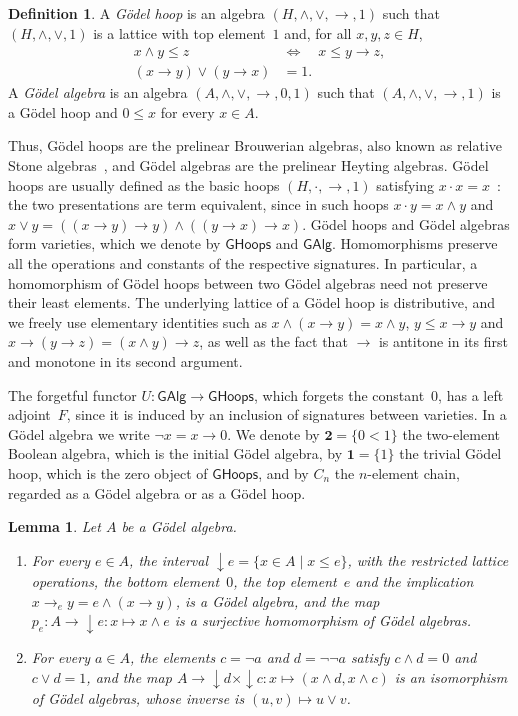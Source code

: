 \documentclass[reqno,a4paper]{amsart}
\theoremstyle{plain}
\newtheorem{lemma}[subsection]{Lemma}
\theoremstyle{definition}
\newtheorem{definition}[subsection]{Definition}
\theoremstyle{remark}
\numberwithin{equation}{section}
\newcommand{\two}{\mathbf{2}}
\newcommand{\GHoops}{\ensuremath{\mathsf{GHoops}}}
\newcommand{\GAlg}{\ensuremath{\mathsf{GAlg}}}
\newcommand{\one}{\mathbf{1}}
\newcommand{\down}{{\downarrow}}
\begin{document}
\begin{definition}\label{DefGodel}
A \emph{G\"odel hoop} is an algebra $(H,\wedge,\vee,\to,1)$ such that $(H,\wedge,\vee,1)$ is a lattice with top element~$1$ and, for all $x,y,z\in H$,
\begin{align}
x\wedge y\leq z\quad&\Longleftrightarrow\quad x\leq y\to z,\label{EqResiduation}\\
(x\to y)\vee(y\to x)&=1.\label{EqPrelinearity}
\end{align}
A \emph{G\"odel algebra} is an algebra $(A,\wedge,\vee,\to,0,1)$ such that $(A,\wedge,\vee,\to,1)$ is a G\"odel hoop and $0\leq x$ for every $x\in A$.
\end{definition}

Thus, G\"odel hoops are the prelinear Brouwerian algebras, also known as relative Stone algebras~\cite{Davey,FG}, and G\"odel algebras are the prelinear Heyting algebras. G\"odel hoops are usually defined as the basic hoops $(H,\cdot,\to,1)$ satisfying $x\cdot x=x$~\cite{AFM}: the two presentations are term equivalent, since in such hoops $x\cdot y=x\wedge y$ and $x\vee y=((x\to y)\to y)\wedge((y\to x)\to x)$. G\"odel hoops and G\"odel algebras form varieties, which we denote by $\GHoops$ and $\GAlg$. Homomorphisms preserve all the operations and constants of the respective signatures. In particular, a homomorphism of G\"odel hoops between two G\"odel algebras need not preserve their least elements. The underlying lattice of a G\"odel hoop is distributive, and we freely use elementary identities such as $x\wedge(x\to y)=x\wedge y$, $y\leq x\to y$ and $x\to(y\to z)=(x\wedge y)\to z$, as well as the fact that $\to$ is antitone in its first and monotone in its second argument.

The forgetful functor $U\colon\GAlg\to\GHoops$, which forgets the constant~$0$, has a left adjoint~$F$, since it is induced by an inclusion of signatures between varieties. In a G\"odel algebra we write $\neg x=x\to0$. We denote by $\two=\{0<1\}$ the two-element Boolean algebra, which is the initial G\"odel algebra, by $\one=\{1\}$ the trivial G\"odel hoop, which is the zero object of $\GHoops$, and by $C_n$ the $n$-element chain, regarded as a G\"odel algebra or as a G\"odel hoop.

\begin{lemma}\label{LemStone}
Let $A$ be a G\"odel algebra.
\begin{enumerate}
\item For every $e\in A$, the interval ${\down}e=\{x\in A\mid x\leq e\}$, with the restricted lattice operations, the bottom element~$0$, the top element~$e$ and the implication $x\to_e y=e\wedge(x\to y)$, is a G\"odel algebra, and the map $p_e\colon A\to{\down}e\colon x\mapsto x\wedge e$ is a surjective homomorphism of G\"odel algebras.
\item For every $a\in A$, the elements $c=\neg a$ and $d=\neg\neg a$ satisfy $c\wedge d=0$ and $c\vee d=1$, and the map $A\to{\down}d\times{\down}c\colon x\mapsto(x\wedge d,x\wedge c)$ is an isomorphism of G\"odel algebras, whose inverse is $(u,v)\mapsto u\vee v$.
\end{enumerate}
\end{lemma}
\end{document}
